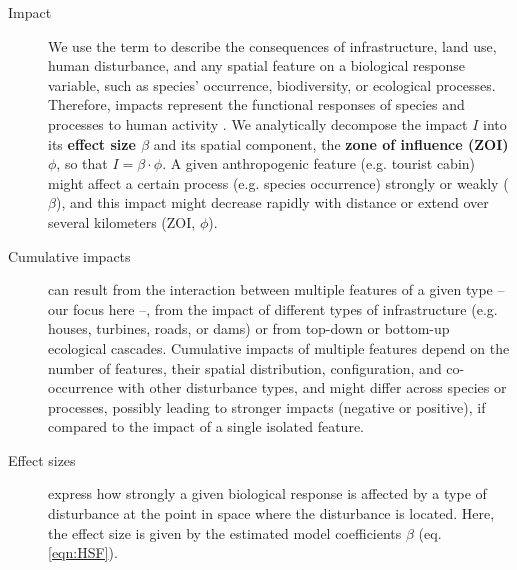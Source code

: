 \documentclass[titlepage]{article}
\begin{document}
\begin{tcolorbox}[width=1.3\textwidth,center,colback=yellow!5,colframe=yellow!75!black,title={Box 1 -- Definitions}]

\begin{description}

    \item[Impact] We use the term to describe the consequences of infrastructure, land use, human disturbance, and any spatial feature on a biological response variable, such as species’ occurrence, biodiversity, or ecological processes. Therefore, impacts represent the functional responses of species and processes to human activity \citep{naugle_unifying_2011}. We analytically decompose the impact $I$ into its \textbf{effect size $\beta$} and its spatial component, the \textbf{zone of influence (ZOI) $\phi$}, so that $I = \beta \cdot \phi$. A given anthropogenic feature (e.g. tourist cabin) might affect a certain process (e.g.  species occurrence) strongly or weakly ($\beta$), and this impact might decrease rapidly with distance or extend over several kilometers (ZOI, $\phi$).
    
    \item[Cumulative impacts] can result from the interaction between multiple features of a given type -- our focus here --, from the impact of different types of infrastructure (e.g. houses, turbines, roads, or dams) or from top-down or bottom-up ecological cascades. Cumulative impacts of multiple features depend on the number of features, their spatial distribution, configuration, and co-occurrence with other disturbance types, and might differ across species or processes, possibly leading to stronger impacts (negative or positive), if compared to the impact of a single isolated feature.
    
    \item[Effect sizes] express how strongly a given biological response is affected by a type of disturbance at the point in space where the disturbance is located. Here, the effect size is given by the estimated model coefficients $\beta$ (eq. \ref{eqn:HSF}).
    

\end{description}
\end{tcolorbox}
\end{document}
